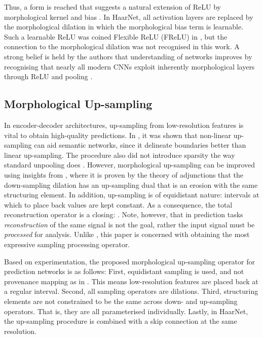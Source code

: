 \documentclass{article}
\begin{document}
Thus, a form is reached that suggests a natural extension of ReLU by morphological kernel  and bias .
In HaarNet, all activation layers are replaced by the morphological dilation in which the morphological bias term  is learnable.
Such a learnable ReLU was coined Flexible ReLU (FReLU) in \cite{qiu2018frelu}, but the connection to the morphological dilation was not recognised in this work.
A strong belief is held by the authors that understanding of networks improves by recognising that nearly all modern CNNs exploit inherently morphological layers through ReLU \cite{velasco2022morphoactivation} and pooling \cite{groenendijk2022morphpool}.


\subsection{Morphological Up-sampling}
In encoder-decoder architectures, up-sampling from low-resolution features is vital to obtain high-quality predictions.
In \cite{groenendijk2022morphpool}, it was shown that non-linear up-sampling can aid semantic networks, since it delineate boundaries better than linear up-sampling.
The procedure also did not introduce sparsity the way standard unpooling does \cite{zeiler2011adaptive,zeiler2014visualizing}.
However, morphological up-sampling can be improved using insights from \cite{heijmans1991morphological}, where it is proven by the theory of adjunctions that the down-sampling dilation has an up-sampling dual that is an erosion with the same structuring element.
In addition, up-sampling is of equidistant nature: intervals at which to place back values are kept constant.
As a consequence, the total reconstruction operator  is a closing: .
Note, however, that in prediction tasks \emph{reconstruction} of the same signal is not the goal, rather the input signal must be \emph{processed} for analysis.
Unlike \cite{heijmans1991morphological}, this paper is concerned with obtaining the most expressive sampling processing operator.

Based on experimentation, the proposed morphological up-sampling operator for prediction networks is as follows:
First, equidistant sampling is used, and not provenance mapping as in \cite{groenendijk2022morphpool}. This means low-resolution features are placed back at a regular interval.
Second, all sampling operators are dilations. 
Third, structuring elements are not constrained to be the same across down- and up-sampling operators. That is, they are all parameterised individually.
Lastly, in HaarNet, the up-sampling procedure is combined with a skip connection at the same resolution.
\end{document}
